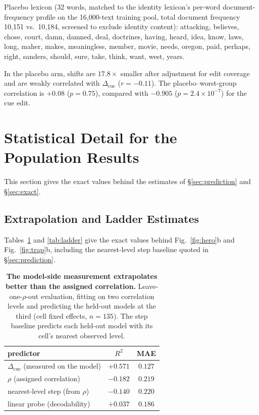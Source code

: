 \documentclass[11pt]{article}
\newcommand{\cued}{\ensuremath{\Delta_{\mathrm{cue}}}}
\begin{document}
Placebo lexicon (32 words, matched to the identity lexicon's per-word
document-frequency profile on the 16{,}000-text training pool, total
document frequency 10{,}151 vs.\ 10{,}184, screened to exclude identity
content): attacking, believes, chose, court, damn, damned, deal, doctrines,
having, heard, idea, know, laws, long, maher, makes, meaningless, member,
movie, needs, oregon, paid, perhaps, right, sanders, should, sure, take,
think, want, west, years.

In the placebo arm, shifts are $17.8\times$ smaller after adjustment for edit
coverage and are weakly correlated with \cued{} ($r{=}{-}0.11$).
The placebo--worst-group correlation is $+0.08$ ($p{=}0.75$), compared with
$-0.905$ ($p{=}2.4{\times}10^{-7}$) for the cue edit.

\section{Statistical Detail for the Population Results}
\label{app:stats}
This section gives the exact values behind the estimates of
\S\ref{sec:prediction} and \S\ref{sec:exact}.

\subsection{Extrapolation and Ladder Estimates}
\label{app:tables}
Tables~\ref{tab:oor} and \ref{tab:ladder} give the exact values behind
Fig.~\ref{fig:hero}b and Fig.~\ref{fig:trap}b, including the nearest-level
step baseline quoted in \S\ref{sec:prediction}.

\begin{table}[t]
\centering\small
\begin{tabular}{lcc}
\toprule
predictor & $R^2$ & MAE \\
\midrule
\cued{} (measured on the model) & $+0.571$ & $0.127$ \\
$\rho$ (assigned correlation)    & $-0.182$ & $0.219$ \\
nearest-level step (from $\rho$) & $-0.140$ & $0.220$ \\
linear probe (decodability)     & $+0.037$ & $0.186$ \\
\bottomrule
\end{tabular}
\caption{\textbf{The model-side measurement extrapolates better than the
assigned correlation.}
Leave-one-$\rho$-out evaluation, fitting on two correlation levels and
predicting the held-out models at the third (cell fixed effects, $n{=}135$).
The step baseline predicts each held-out model with its cell's nearest
observed level.}
\label{tab:oor}
\end{table}
\end{document}
